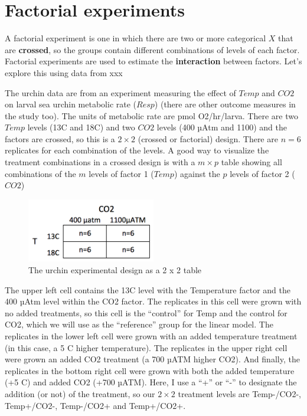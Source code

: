 \documentclass[]{book}
\begin{document}
\section{Factorial experiments}\label{factorial-experiments}

A factorial experiment is one in which there are two or more categorical
\(X\) that are \textbf{crossed}, so the groups contain different
combinations of levels of each factor. Factorial experiments are used to
estimate the \textbf{interaction} between factors. Let's explore this
using data from xxx

The urchin data are from an experiment measuring the effect of \(Temp\)
and \(CO2\) on larval sea urchin metabolic rate (\(Resp\)) (there are
other outcome measures in the study too). The units of metabolic rate
are pmol O2/hr/larva. There are two \(Temp\) levels (13C and 18C) and
two \(CO2\) levels (400 µAtm and 1100) and the factors are crossed, so
this is a \(2 \times 2\) (crossed or factorial) design. There are
\(n=6\) replicates for each combination of the levels. A good way to
visualize the treatment combinations in a crossed design is with a
\(m \times p\) table showing all combinations of the \(m\) levels of
factor 1 (\(Temp\)) against the \(p\) levels of factor 2 (\(CO2\))

\begin{figure}
\centering
\includegraphics[width=0.50000\textwidth]{images/2x2_table.png}
\caption{The urchin experimental design as a 2 x 2 table}
\end{figure}

The upper left cell contains the 13C level with the Temperature factor
and the 400 µAtm level within the CO2 factor. The replicates in this
cell were grown with no added treatments, so this cell is the
``control'' for Temp and the control for CO2, which we will use as the
``reference'' group for the linear model. The replicates in the lower
left cell were grown with an added temperature treatment (in this case,
a 5 C higher temperature). The replicates in the upper right cell were
grown an added CO2 treatment (a 700 µATM higher CO2). And finally, the
replicates in the bottom right cell were grown with both the added
temperature (+5 C) and added CO2 (+700 µATM). Here, I use a ``+'' or
``-'' to designate the addition (or not) of the treatment, so our
\(2 \times 2\) treatment levels are Temp-/CO2-, Temp+/CO2-, Temp-/CO2+
and Temp+/CO2+.
\end{document}
